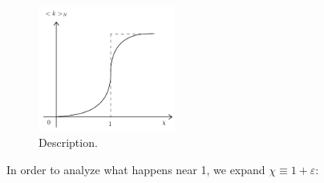 \documentclass[../main/main.tex]{subfiles}
\begin{document}
\begin{figure}[h!]
\centering
\includegraphics[width=0.4\textwidth]{../lessons/9_image/3.pdf}
\caption{\label{fig:9_3} Description.}
\end{figure}

 In order to analyze what happens near 1, we expand \( \chi \equiv 1+\varepsilon  \):
\end{document}
